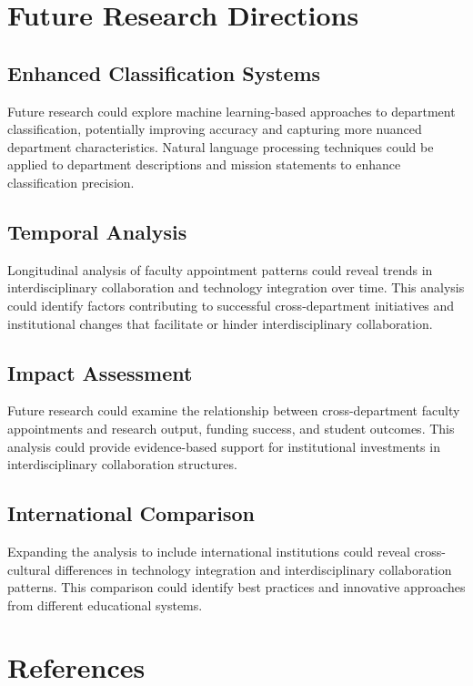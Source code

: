 \documentclass[12pt]{article}
\begin{document}
\section{Future Research Directions}

\subsection{Enhanced Classification Systems}

Future research could explore machine learning-based approaches to department classification, potentially improving accuracy and capturing more nuanced department characteristics. Natural language processing techniques could be applied to department descriptions and mission statements to enhance classification precision.

\subsection{Temporal Analysis}

Longitudinal analysis of faculty appointment patterns could reveal trends in interdisciplinary collaboration and technology integration over time. This analysis could identify factors contributing to successful cross-department initiatives and institutional changes that facilitate or hinder interdisciplinary collaboration.

\subsection{Impact Assessment}

Future research could examine the relationship between cross-department faculty appointments and research output, funding success, and student outcomes. This analysis could provide evidence-based support for institutional investments in interdisciplinary collaboration structures.

\subsection{International Comparison}

Expanding the analysis to include international institutions could reveal cross-cultural differences in technology integration and interdisciplinary collaboration patterns. This comparison could identify best practices and innovative approaches from different educational systems.

\section{References}
\end{document}
